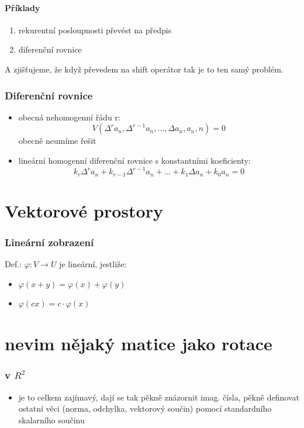 \documentclass{article}
\begin{document}
\subsection{Příklady}
\begin{enumerate}
  \item rekurentní posloupnosti převést na předpis
  \item diferenční rovnice
\end{enumerate}
A zjišťujeme, že když převedem na shift operátor tak je to ten samý problém.

\section{Diferenční rovnice}
\begin{itemize}
  \item obecná nehomogenní řádu r: $$V(\Delta^r a_n, \Delta^{r-1} a_n,..., \Delta a_n, a_n, n) = 0$$ obecně neumíme řešit
  \item lineární homogenní diferenční rovnice s konstantními koeficienty: $$ k_r \Delta^r a_n + k_{r-1} \Delta^{r-1} a_n + ... + k_1 \Delta a_n + k_0 a_n = 0$$
\end{itemize}

\part{Vektorové prostory}
\section{Lineární zobrazení}
Def.: $\varphi: V \rightarrow U$ je lineární, jestliže:
\begin{itemize}
  \item $\varphi (x+y) = \varphi (x) + \varphi (y)$
  \item $\varphi (cx) = c \cdot \varphi (x)$
\end{itemize}

\part{nevim nějaký matice jako rotace}
\section{v $R^2$}
\begin{itemize}
  \item je to celkem zajímavý, dají se tak pěkně znázornit imag. čísla, pěkně definovat ostatní věci (norma, odchylka, vektorový součin) pomocí standardního skalarního součinu
\end{itemize}
\end{document}
